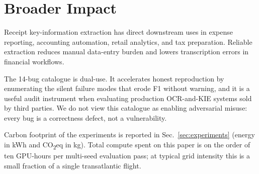 \section{Broader Impact}
\label{sec:broader_impact}

Receipt key-information extraction has direct downstream uses in
expense reporting, accounting automation, retail analytics, and tax
preparation.  Reliable extraction reduces manual data-entry burden
and lowers transcription errors in financial workflows.

The 14-bug catalogue is dual-use.  It accelerates honest reproduction
by enumerating the silent failure modes that erode F1 without
warning, and it is a useful audit instrument when evaluating
production OCR-and-KIE systems sold by third parties.  We do not
view this catalogue as enabling adversarial misuse: every bug is a
correctness defect, not a vulnerability.

Carbon footprint of the experiments is reported in
Sec.~\ref{sec:experiments} (energy in kWh and CO\textsubscript{2}eq
in kg).  Total compute spent on this paper is on the order of ten
GPU-hours per multi-seed evaluation pass; at typical grid intensity
this is a small fraction of a single transatlantic flight.
